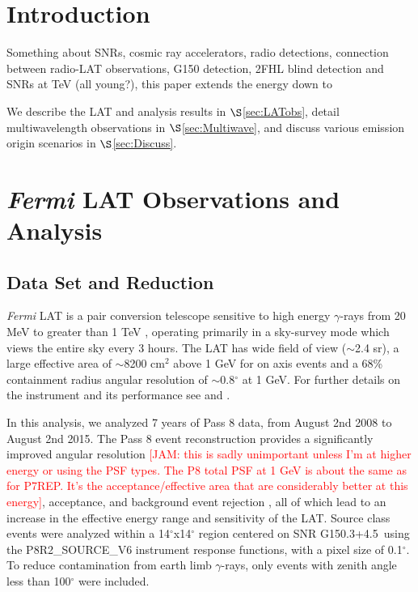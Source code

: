 \documentclass[preprint2]{aastex}
\newcommand{\kibitz}[2]{\ifnum\Comments=1\textcolor{#1}{#2}\fi}
\newcommand{\jamie}[1]{\kibitz{red}      {[JAM: #1]}}
\newcommand{\gam}{$\gamma$-ray}
\newcommand{\FermiLat}{\emph{Fermi} LAT }     %
\newcommand{\Gone}{G150.3+4.5}
\begin{document}
\section{Introduction} 



Something about SNRs, cosmic ray accelerators, radio detections, connection between radio-LAT observations, G150 detection, 2FHL blind detection and SNRs at TeV (all young?), this paper extends the energy down to

We describe the LAT and analysis results in $\S$\ref{sec:LATobs}, detail multiwavelength observations in $\S$\ref{sec:Multiwave}, and discuss various emission origin scenarios in $\S$\ref{sec:Discuss}.
%
%
\section{\label{sec:LATobs}\FermiLat  Observations and  Analysis }
\subsection{\label{sec:LATdata}Data Set and Reduction}
\FermiLat is a pair conversion telescope sensitive to high energy \gam s  from 20 MeV to greater than 1 TeV \citep{2FHL}, operating primarily in a sky-survey mode which views  the entire sky every 3 hours. The LAT has wide field of view ($\sim$2.4 sr), a large effective area of $\sim$8200 cm$^2$ above 1 GeV for on axis events and a  68\% containment radius angular resolution  of $\sim$0.8$^\circ$  at 1 GeV. For further details  on the instrument and its performance see \cite{atwood09} and \cite{lat_perf}.

In this analysis, we  analyzed 7 years of Pass 8 data, from August 2nd 2008  to August 2nd 2015. The Pass 8 event reconstruction provides a significantly improved angular resolution \jamie{this is sadly unimportant unless I'm at higher energy or using the PSF types. The P8 total PSF at 1 GeV is about the same as for P7REP. It's the acceptance/effective area that are considerably better at this energy}, acceptance, and background event rejection \citep{atwood13b,atwood13}, all of which lead to an increase in the effective energy range and sensitivity of the LAT. Source class events were analyzed within a 14$^\circ$x14$^\circ$ region centered on SNR \Gone~using the P8R2\_SOURCE\_V6 instrument response functions, with a pixel size of 0.1$^{\circ}$. To reduce contamination from earth limb \gam s, only events with zenith angle less than 100$^{\circ}$ were included.
\end{document}

